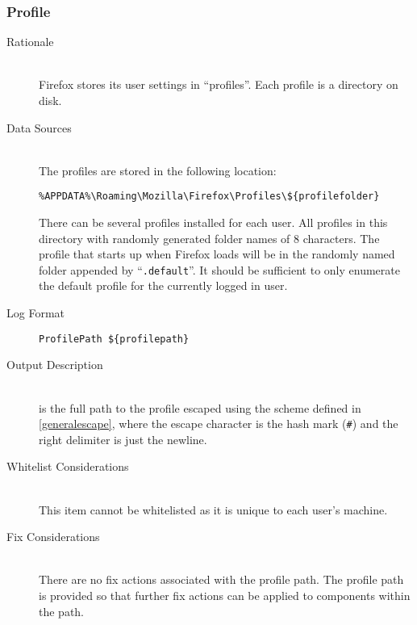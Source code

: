 \subsubsection{Profile}
\begin{description}
\item[Rationale] \hfill \\
Firefox stores its user settings in ``profiles''.  Each profile is a directory
on disk.  
\item[Data Sources] \hfill \\
The profiles are stored in the following location:
\vspace{-\baselineskip}
\begin{verbatim}
%APPDATA%\Roaming\Mozilla\Firefox\Profiles\${profilefolder}
\end{verbatim}
There can be several profiles installed for each user.   All profiles in this
directory with randomly generated folder names of 8 characters.  The profile
that starts up when Firefox loads will be in the randomly named folder appended
by ``\verb|.default|''.  It should be sufficient to only enumerate the default
profile for the currently logged in user.
\item[Log Format] \hfill 
\vspace{-\baselineskip}
\begin{verbatim}
ProfilePath ${profilepath}
\end{verbatim}
\item[Output Description] \hfill \\
 is the full path to the profile escaped using the scheme
defined in \ref{generalescape}, where the escape character is the hash mark
(\verb|#|) and the right delimiter is just the newline.
\item[Whitelist Considerations] \hfill \\
This item cannot be whitelisted as it is unique to each user's machine.
\item[Fix Considerations] \hfill \\
There are no fix actions associated with the profile path.  The profile path is
provided so that further fix actions can be applied to components within the
path.
\end{description}

